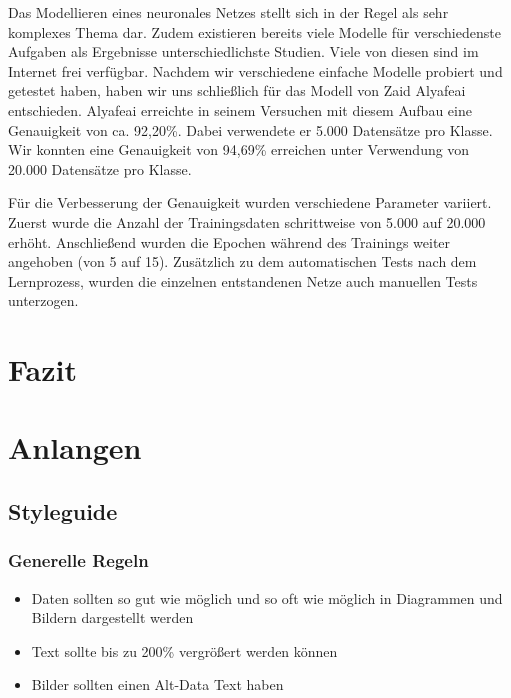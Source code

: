 \documentclass[11pt]{article}
\begin{document}
Das Modellieren eines neuronales Netzes stellt sich in der Regel als sehr komplexes Thema dar. Zudem existieren bereits viele Modelle für verschiedenste Aufgaben als Ergebnisse unterschiedlichste Studien. Viele von diesen sind im Internet frei verfügbar. Nachdem wir verschiedene einfache Modelle probiert und getestet haben, haben wir uns schließlich für das Modell von Zaid Alyafeai\parencite{ZaidAlyafeai2018} entschieden. Alyafeai erreichte in seinem Versuchen mit diesem Aufbau eine Genauigkeit von ca. 92,20\%. Dabei verwendete er 5.000 Datensätze pro Klasse. Wir konnten eine Genauigkeit von   94,69\% erreichen unter Verwendung von 20.000 Datensätze pro Klasse.

Für die Verbesserung der Genauigkeit wurden verschiedene Parameter variiert. Zuerst wurde die Anzahl der Trainingsdaten schrittweise von 5.000 auf 20.000 erhöht. Anschließend wurden die Epochen während des Trainings weiter angehoben (von 5 auf 15). 
Zusätzlich zu dem automatischen Tests nach dem Lernprozess, wurden die einzelnen entstandenen Netze auch manuellen Tests unterzogen.

\section{Fazit}

\pagebreak

\section{Anlangen}
\label{chap: Anlagen}
\subsection{Styleguide}
\subsubsection{Generelle Regeln}
\begin{itemize}
\item Daten sollten so gut wie möglich und so oft wie möglich in Diagrammen und Bildern dargestellt werden
\item Text sollte bis zu 200\% vergrößert werden können
\item Bilder sollten einen Alt-Data Text haben
\end{itemize}
\end{document}

